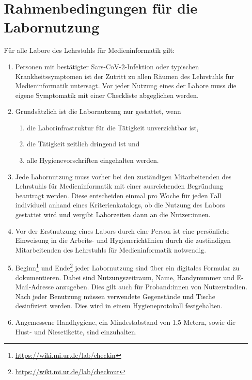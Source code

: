 \section{Rahmenbedingungen für die Labornutzung}\label{sec:allgemein}

\noindent
Für alle Labore des Lehrstuhls für Medieninformatik gilt:

\begin{enumerate}
    \item{Personen mit bestätigter Sars-CoV-2-Infektion oder typischen Krankheitssymptomen ist der Zutritt zu allen Räumen des Lehrstuhls für Medieninformatik untersagt. Vor jeder Nutzung eines der Labore muss die eigene Symptomatik mit einer Checkliste abgeglichen werden.}
    \item Grundsätzlich ist die Labornutzung nur gestattet, wenn
    \begin{enumerate}
        \item die Laborinfrastruktur für die Tätigkeit unverzichtbar ist,
        \item die Tätigkeit zeitlich dringend ist und 
        \item alle Hygienevorschriften eingehalten werden.
    \end{enumerate}
    \item{Jede Labornutzung muss vorher bei den zuständigen Mitarbeitenden des Lehrstuhls für Medieninformatik mit einer ausreichenden Begründung beantragt werden. Diese entscheiden einmal pro Woche für jeden Fall individuell anhand eines Kriterienkatalogs, ob die Nutzung des Labors gestattet wird und vergibt Laborzeiten dann an die Nutzer:innen.}
    \item{Vor der Erstnutzung eines Labors durch eine Person ist eine persönliche Einweisung in die Arbeits- und Hygienerichtlinien durch die zuständigen Mitarbeitenden des Lehrstuhls für Medieninformatik notwendig.}
    \item{Beginn\footnote{\url{https://wiki.mi.ur.de/lab/checkin}} und Ende\footnote{\url{https://wiki.mi.ur.de/lab/checkout}} jeder Labornutzung sind über ein digitales Formular zu dokumentieren.
    Dabei sind Nutzungszeitraum, Name, Handynummer und E-Mail-Adresse anzugeben.
    Dies gilt auch für Proband:innen von Nutzerstudien.
    Nach jeder Benutzung müssen verwendete Gegenstände und Tische desinfiziert werden.
    Dies wird in einem Hygieneprotokoll festgehalten.}
    \item{Angemessene Handhygiene, ein Mindestabstand von 1,5 Metern, sowie die Hust- und Niesetikette, sind einzuhalten.

}
\end{enumerate}
